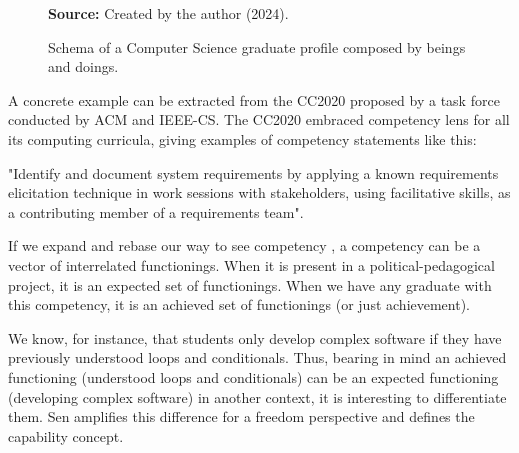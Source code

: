 \begin{figure}[ht!]
    \centering
    
    \caption{\textmd{Schema of a Computer Science graduate profile composed by beings and doings.}}
    \label{fig:graduate-profile}
    
    \par\medskip\ABNTEXfontereduzida\selectfont\textbf{Source:} Created by the author (2024). \par\medskip
\end{figure}

A concrete example can be extracted from the \gls{CC2020} proposed by a task force conducted by \gls{ACM} and \gls{IEEE-CS}. The \gls{CC2020} \cite[p.~52]{acm:2020} embraced competency lens for all its computing curricula, giving examples of competency statements like this:  
\begin{citacao}
    "Identify and document system requirements by applying a known requirements elicitation technique in work sessions with stakeholders, using facilitative skills, as a contributing member of a requirements team".  
\end{citacao}
If we expand and rebase our way to see competency \cite{lozano:2012}, a competency can be a vector of interrelated functionings. When it is present in a political-pedagogical project, it is an expected set of functionings. When we have any graduate with this competency, it is an achieved set of functionings (or just achievement).

We know, for instance, that students only develop complex software if they have previously understood loops and conditionals. Thus, bearing in mind an achieved functioning (understood loops and conditionals) can be an expected functioning (developing complex software) in another context, it is interesting to differentiate them. Sen amplifies this difference for a freedom perspective and defines the capability concept.


